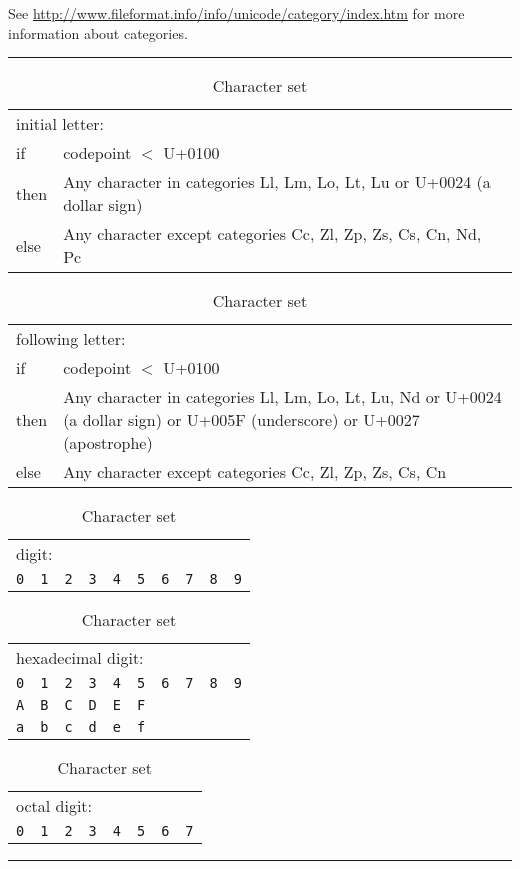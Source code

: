 \documentclass{overturerepchap}
\newcommand{\blankline}{\vspace{\baselineskip}}
\begin{document}
See \url{http://www.fileformat.info/info/unicode/category/index.htm} for
more information about categories. 

\begin{table}[ht]
\setlength{\tabcolsep}{3.5mm}
\setlength{\arraycolsep}{3.5mm}

\rule{\textwidth}{.5mm}
        \begin{tabular}{lp{13cm}}
        \multicolumn{2}{l}{\rm initial letter:} \\
        if   & codepoint $<$ U+0100 \\
        then &  Any character in categories Ll, Lm, Lo, Lt, Lu or U+0024 (a dollar sign) \\
        else & Any character except categories Cc, Zl, Zp, Zs, Cs,
                Cn, Nd, Pc \\
    \end{tabular}

\blankline
\begin{tabular}{lp{13cm}}
        \multicolumn{2}{l}{following letter: }\\
        if   & codepoint $<$ U+0100 \\
        then & Any character in categories Ll, Lm, Lo, Lt, Lu, Nd or 
               U+0024 (a dollar sign) or U+005F (underscore) or U+0027 (apostrophe) \\
        else & Any character except categories Cc, Zl, Zp, Zs, Cs, Cn 
    \end{tabular}

\blankline
    \begin{tabular}{*{10}{l}}
        \multicolumn{10}{l}{digit:} \\
        {\tt 0}
        & {\tt 1} 
        & {\tt 2} 
        & {\tt 3} 
        & {\tt 4} 
        & {\tt 5}
        & {\tt 6} 
        & {\tt 7} 
        & {\tt 8} 
        & {\tt 9} 
     \end{tabular}

\blankline
    \begin{tabular}{*{10}{l}}
        \multicolumn{10}{l}{hexadecimal digit:} \\
        {\tt 0} & {\tt 1} & {\tt 2} & {\tt 3} & {\tt 4} & {\tt 5} & {\tt 6} & {\tt 7} & {\tt 8} & {\tt 9} \\
        {\tt A} & {\tt B} & {\tt C} & {\tt D} & {\tt E} & {\tt F} \\
        {\tt a} & {\tt b} & {\tt c} & {\tt d} & {\tt e} & {\tt f} 
     \end{tabular}

\blankline
    \begin{tabular}{*{8}{l}}
        \multicolumn{8}{l}{octal digit:} \\
        {\tt 0}
        & {\tt 1} 
        & {\tt 2} 
        & {\tt 3} 
        & {\tt 4} 
        & {\tt 5}
        & {\tt 6} 
        & {\tt 7} 
     \end{tabular}

\rule{\textwidth}{.5mm}
\hypertarget{charSetTable}{\caption{Character set}}
\label{charSetTable}

\end{table}
\end{document}
